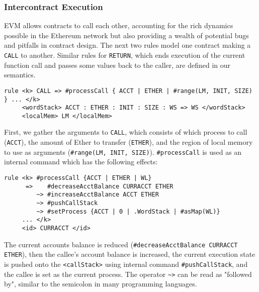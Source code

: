 \subsubsection{Intercontract Execution}

EVM allows contracts to call each other, accounting for the rich dynamics
possible in the Ethereum network but also providing a wealth of potential bugs
and pitfalls in contract design. The next two rules model one contract making a
\texttt{CALL} to another. Similar rules for \texttt{RETURN}, which ends
execution of the current function call and passes some values back to the
caller, are defined in our semantics.

\begin{verbatim}
rule <k> CALL => #processCall { ACCT | ETHER | #range(LM, INIT, SIZE) } ... </k>
     <wordStack> ACCT : ETHER : INIT : SIZE : WS => WS </wordStack>
     <localMem> LM </localMem>
\end{verbatim}

First, we gather the arguments to \texttt{CALL}, which consists of which process
to call (\texttt{ACCT}), the amount of Ether to transfer (\texttt{ETHER}), and
the region of local memory to use as arguments (\texttt{\#range(LM, INIT,
SIZE)}). \texttt{\#processCall} is used as an internal command which has the
following effects:

\begin{verbatim}
rule <k> #processCall {ACCT | ETHER | WL}
      =>    #decreaseAcctBalance CURRACCT ETHER
         ~> #increaseAcctBalance ACCT ETHER
         ~> #pushCallStack
         ~> #setProcess {ACCT | 0 | .WordStack | #asMap(WL)}
     ... </k>
     <id> CURRACCT </id>
\end{verbatim}

The current accounts balance is reduced (\texttt{\#decreaseAcctBalance CURRACCT
ETHER}), then the callee's account balance is increased, the current execution
state is pushed onto the \texttt{<callStack>} using internal command
\texttt{\#pushCallStack}, and the callee is set as the current process. The
operator \texttt{\textasciitilde >} can be read as "followed by", similar to the semicolon in
many programming languages.
